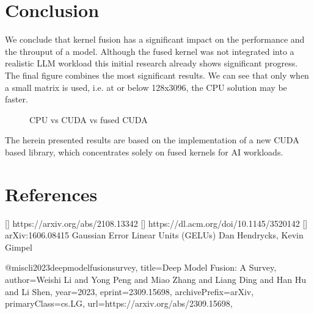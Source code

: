 \documentclass[letterpaper]{article}
\begin{document}
\section{Conclusion}



We conclude that kernel fusion has a significant impact on the performance and the throuput of a model. Although the fused kernel was not integrated into a realistic LLM workload this initial research already shows significant progress. The final figure combines the most significant results. We can see that only when a small matrix is used, i.e. at or below 128x3096, the CPU solution may be faster. 

\begin{figure}
\caption{CPU vs CUDA vs fused CUDA}
\label{cudaGelu}
\end{figure}


The herein presented results are based on the implementation of a new CUDA based library, which concentrates solely on fused kernels for AI workloads. 

\section{References}
[] https://arxiv.org/abs/2108.13342
[] https://dl.acm.org/doi/10.1145/3520142
[] arXiv:1606.08415 Gaussian Error Linear Units (GELUs) Dan Hendrycks, Kevin Gimpel

@misc{li2023deepmodelfusionsurvey,
      title={Deep Model Fusion: A Survey}, 
      author={Weishi Li and Yong Peng and Miao Zhang and Liang Ding and Han Hu and Li Shen},
      year={2023},
      eprint={2309.15698},
      archivePrefix={arXiv},
      primaryClass={cs.LG},
      url={https://arxiv.org/abs/2309.15698}, 
}
\end{document}
